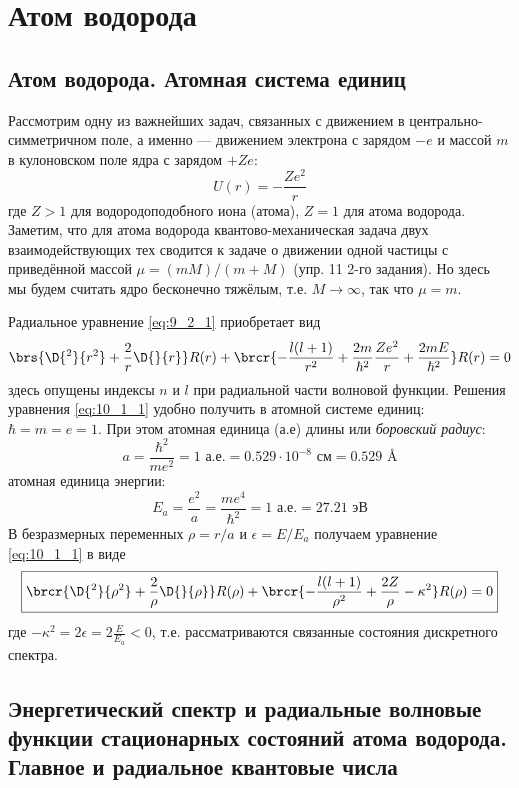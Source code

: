 \chapter{Атом водорода}

\section{Атом водорода. Атомная система единиц}

Рассмотрим одну из важнейших задач, связанных с движением в центрально-симметричном поле, а именно — движением электрона с зарядом $-e$ и массой $m$ в кулоновском поле ядра с зарядом $+Ze$:
$$
U(r) = -\frac{Ze^2}{r}
$$%
%
где $Z>1$ для водородоподобного иона (атома), $Z=1$ для атома водорода. Заметим, что для атома водорода квантово-механическая задача двух взаимодействующих тех сводится к задаче о движении одной частицы с приведённой массой $\mu = (m M)/(m + M)$ (упр. 11 2-го задания). Но здесь мы будем считать ядро бесконечно тяжёлым, т.е. $M \to \infty$, так что $\mu = m$.

Радиальное уравнение \eqref{eq:9_2_1} приобретает вид
\begin{equation}
\label{eq:10_1_1}
\brs{\D{^2}{r^2} + \frac{2}{r}\D{}{r}} R(r) + 
\brcr{-\frac{l(l+1)}{r^2} + \frac{2m}{\hbar^2}\frac{Ze^2}{r} + \frac{2mE}{\hbar^2}} R(r) = 0
\end{equation}%
%
здесь опущены индексы $n$ и $l$ при радиальной части волновой функции. Решения уравнения \eqref{eq:10_1_1} удобно получить в атомной системе единиц: $\hbar = m = e = 1$. При этом атомная единица (а.е) длины или {\em боровский радиус}:
$$
a = \frac{\hbar^2}{me^2} = 1\text{~а.е.} = 0.529 \cdot 10^{-8} \text{~см} = 0.529 \text{~\AA}
$$%
%
атомная единица энергии:
$$
E_a = \frac{e^2}{a} = \frac{me^4}{\hbar^2} = 1 \text{~а.е.} = 27.21 \text{~эВ}
$$%
%
В безразмерных переменных $\rho = r/a$ и $\epsilon = E/E_a$ получаем уравнение \eqref{eq:10_1_1} в виде
\begin{equation}
\label{eq:10_1_2}
\boxed{
	\brcr{\D{^2}{\rho^2} + \frac{2}{\rho} \D{}{\rho}} R(\rho) + \brcr{-\frac{l(l+1)}{\rho^2} + \frac{2Z}{\rho} - \kappa^2} R(\rho) = 0
}
\end{equation}%
%
где $-\kappa^2 = 2 \epsilon = 2 \frac{E}{E_a} < 0$, т.е. рассматриваются связанные состояния дискретного спектра.

\section{Энергетический спектр и радиальные волновые функции стационарных состояний атома водорода. Главное и радиальное квантовые числа}

